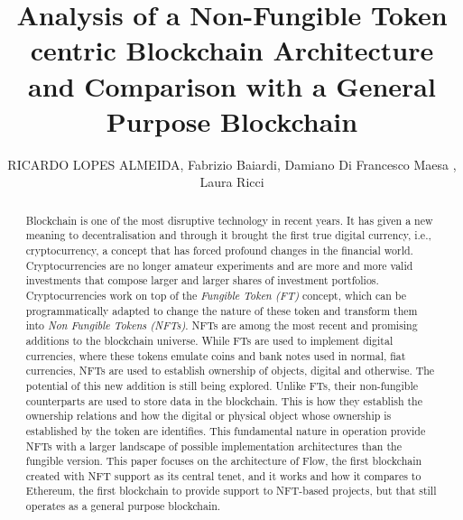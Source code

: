 \documentclass{ieeeaccess}
\begin{document}
\doi{}

\title{Analysis of a Non-Fungible Token centric Blockchain Architecture and Comparison with a General Purpose Blockchain}
\author{\uppercase{Ricardo Lopes Almeida},
    Fabrizio Baiardi,
    Damiano Di Francesco Maesa ,
    Laura Ricci
}

\address[1]{Universit\`{a} di Camerino, 62032 MC, Camerino, Italia (e-mail: ricardo.almeida@unicam.it)}
\address[2]{Dipartimento di Informatica, Universit\`{a} di Pisa, 56127 PI, Pisa, Italia}




\begin{abstract}
    Blockchain is one of the most disruptive technology in recent years. It has given a new meaning to decentralisation and through it brought the first true digital currency, i.e., cryptocurrency, a concept that has forced profound changes in the financial world. Cryptocurrencies are no longer amateur experiments and are more and more valid investments that compose larger and larger shares of investment portfolios. Cryptocurrencies work on top of the \textit{Fungible Token (FT)} concept, which can be programmatically adapted to change the nature of these token and transform them into \textit{Non Fungible Tokens (NFTs)}. NFTs are among the most recent and promising additions to the blockchain universe. While FTs are used to implement digital currencies, where these tokens emulate coins and bank notes used in normal, fiat currencies, NFTs are used to establish ownership of objects, digital and otherwise. The potential of this new addition is still being explored. Unlike FTs, their non-fungible counterparts are used to store data in the blockchain. This is how they establish the ownership relations and how the digital or physical object whose ownership is established by the token are identifies. This fundamental nature in operation provide NFTs with a larger landscape of possible implementation architectures than the fungible version. This paper focuses on the architecture of Flow, the first blockchain created with NFT support as its central tenet, and it works and how it compares to Ethereum, the first blockchain to provide support to NFT-based projects, but that still operates as a general purpose blockchain.
\end{abstract}
\end{document}
